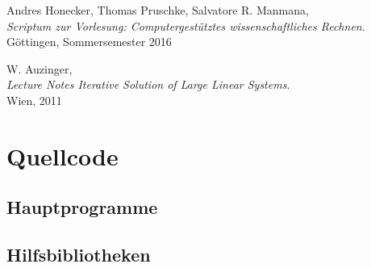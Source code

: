 \documentclass[12pt,a4paper,titlepage,headinclude,bibtotoc]{scrartcl}
\begin{document}
\begin{thebibliography}{9}
  Andres Honecker, Thomas Pruschke, Salvatore R. Manmana, \\
  \emph{Scriptum zur Vorlesung: Computergestütztes wissenschaftliches Rechnen}. \\
 Göttingen,
  Sommersemester 2016

  W. Auzinger, \\
  \emph{Lecture Notes Iterative Solution of Large Linear Systems}. \\
 Wien, 2011
 
 
 
 \end{thebibliography}
\clearpage

\clearpage

\appendix
\section{Quellcode}
\subsection{Hauptprogramme}
\label{sec:source_main} 



\clearpage

\subsection{Hilfsbibliotheken}
\label{sec:source_lib} 






\end{document}
